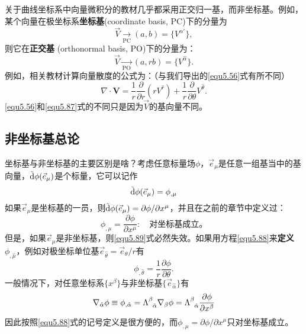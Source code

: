关于曲线坐标系中向量微积分的教材几乎都采用正交归一基，而非坐标基。例如，某个向量在极坐标系\textbf{坐标基}(coordinate basis, PC)下的分量为
\begin{equation}
    \vec{V} \xrightarrow[\text{PC}]{ } (a, b) = \{ V^{\alpha'} \},
\label{equ5.85}
\end{equation}
则它在\textbf{正交基} (orthonormal basis, PO)下的分量为：
\begin{equation}
    \Vec{V} \xrightarrow[\text{PO}]{ } (a, rb) = \{ V^{\hat{\alpha}} \}.
\label{equ5.86}
\end{equation}
例如，相关教材计算向量散度的公式为：（与我们导出的\eqref{equ5.56}式有所不同）
\begin{equation}
    \nabla \cdot \mathbf{V} = \frac{1}{r} \frac{\partial}{\partial r} (r V^{\hat{r}}) + \frac{1}{r} \frac{\partial}{\partial \theta} V^{\hat{\theta}}.
\label{equ5.87}
\end{equation}
\eqref{equ5.56}和\eqref{equ5.87}式的不同只是因为$\Vec{V}$的基向量不同。

\subsection*{非坐标基总论}
坐标基与非坐标基的主要区别是啥？考虑任意标量场$\phi$，$\vec{e}_\mu$是任意一组基当中的基向量，$\tilde{\mathrm{d}} \phi (\vec{e}_\mu)$是个标量，它可以记作
\begin{equation}
    \tilde{\mathrm{d}} \phi (\vec{e}_\mu) = \phi_{,\mu}
\label{equ5.88}
\end{equation}
如果$\vec{e}_\mu$是坐标基的一员，则$\tilde{\mathrm{d}} \phi (\vec{e}_\mu) = \partial \phi / \partial x^\mu$，并且在之前的章节中定义过：
\begin{equation}
    \phi_{, \mu} = \frac{\partial \phi}{\partial x^\mu}: \quad \text{对坐标基成立。}
\label{equ5.89}
\end{equation}
但是，如果$\vec{e}_\mu$是非坐标基，则\eqref{equ5.89}式必然失效。如果用方程\eqref{equ5.88}来\textbf{定义} $\phi_{,\hat{\mu}}$，例如对极坐标单位基$\vec{e}_{\hat{\theta}} = \vec{e}_{\theta} / r$有
\begin{equation}
    \phi_{, \hat{\theta}} = \frac{1}{r} \frac{\partial \phi}{\partial \theta}.
\label{equ5.90}
\end{equation}
一般情况下，对任意坐标系$\{ x^\beta \}$与非坐标基$\{ \vec{e}_{\hat{\alpha}} \}$有
\begin{equation}
    \nabla_{\hat{\alpha}} \phi \equiv \phi_{, \hat{\alpha}} = \Lambda\indices{^\beta_{\hat{\alpha}}} \nabla_\beta \phi = \Lambda\indices{^\beta_{\hat{\alpha}}} \frac{\partial \phi}{\partial x^\beta}
\label{equ5.91}
\end{equation}
因此按照\eqref{equ5.88}式的记号定义是很方便的，而$\phi_{, \mu} = \partial \phi / \partial x^\mu$只对坐标基成立。

